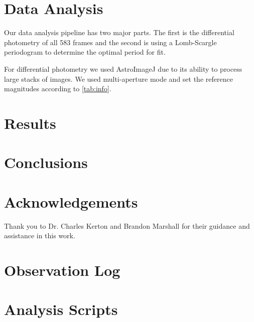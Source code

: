 \documentclass[%
aip,
jmp,
reprint,
floatfix,
nofootinbib
]{revtex4-1}
\begin{document}
	\section{Data Analysis}
	
	Our data analysis pipeline has two major parts. The first is the differential photometry of all 583 frames and the second is using a Lomb-Scargle periodogram to determine the optimal period for fit. 
	
	For differential photometry we used AstroImageJ due to its ability to process large stacks of images. We used multi-aperture mode and set the reference magnitudes according to \autoref{tab:info}.


	
	\section{Results}
	 
	
	
	\section{Conclusions}
	
	
	
	\section*{Acknowledgements}
	
	Thank you to Dr. Charles Kerton and Brandon Marshall for their guidance and assistance in this work.
	
	\medskip
	
	
	
	
	\onecolumngrid
	\appendix
	\section{Observation Log}

	\begin{table}[h!]
		\centering
		
		\label{table:log1}
	\end{table}

	\begin{table}[h!]
		\centering
		
		\label{table:log2}
	\end{table}
	
	\section{Analysis Scripts}
	
	
\end{document}
